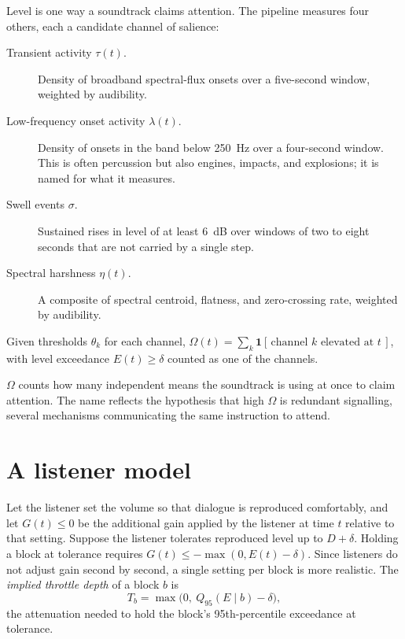 Level is one way a soundtrack claims attention. The pipeline measures four others, each a candidate channel of salience:

\begin{description}
\item[Transient activity $\tau(t)$.] Density of broadband spectral-flux onsets over a five-second window, weighted by audibility.
\item[Low-frequency onset activity $\lambda(t)$.] Density of onsets in the band below 250~Hz over a four-second window. This is often percussion but also engines, impacts, and explosions; it is named for what it measures.
\item[Swell events $\sigma$.] Sustained rises in level of at least 6~dB over windows of two to eight seconds that are not carried by a single step.
\item[Spectral harshness $\eta(t)$.] A composite of spectral centroid, flatness, and zero-crossing rate, weighted by audibility.
\end{description}

\begin{definition}
Given thresholds $\theta_k$ for each channel, $\Omega(t) = \sum_k \mathbf{1}[\,\text{channel } k \text{ elevated at } t\,]$, with level exceedance $E(t)\ge\delta$ counted as one of the channels.
\end{definition}

$\Omega$ counts how many independent means the soundtrack is using at once to claim attention. The name reflects the hypothesis that high $\Omega$ is redundant signalling, several mechanisms communicating the same instruction to attend.

\section{A listener model}

Let the listener set the volume so that dialogue is reproduced comfortably, and let $G(t)\le 0$ be the additional gain applied by the listener at time $t$ relative to that setting. Suppose the listener tolerates reproduced level up to $D+\delta$. Holding a block at tolerance requires $G(t) \le -\max(0, E(t)-\delta)$. Since listeners do not adjust gain second by second, a single setting per block is more realistic. The \emph{implied throttle depth} of a block $b$ is
\begin{equation}
T_b = \max\big(0,\ Q_{95}(E \mid b) - \delta\big),
\end{equation}
the attenuation needed to hold the block's 95th-percentile exceedance at tolerance.

